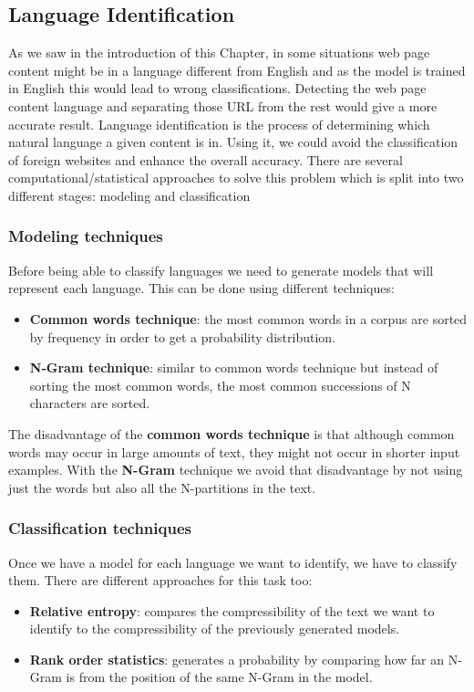 \subsection{Language Identification}
As we saw in the introduction of this Chapter, in some situations web page content might be in a language different from English and as the model is trained in English this would lead to wrong 
classifications. Detecting the web page content language and separating those URL from the rest would give a more accurate result.
Language identification is the process of determining which natural language a given content is in. Using it, we could avoid the classification of foreign websites and enhance the overall accuracy.
There are several computational/statistical approaches to solve this problem which is split into two different stages: modeling and classification

\subsubsection{Modeling techniques}
Before being able to classify languages we need to generate models that will represent each language. This can be done using different techniques:
\begin{itemize}
  \item {\bf Common words technique}: the most common words in a corpus are sorted by frequency in order to get a probability distribution.
  \item {\bf N-Gram technique}: similar to common words technique but instead of sorting the most common words, the most common successions of N characters are sorted.
\end{itemize}  
The disadvantage of the {\bf common words technique} is that although common words may occur in large amounts of text, they might not occur in shorter input examples. With the {\bf N-Gram} technique 
we avoid that disadvantage by not using just the words but also all the N-partitions in the text.


\subsubsection{Classification techniques}
Once we have a model for each language we want to identify, we have to classify them. There are different approaches for this task too:
\begin{itemize}
  \item {\bf Relative entropy}: compares the compressibility of the text we want to identify to the compressibility of the previously generated models.
  \item {\bf Rank order statistics}: generates a probability by comparing how far an N-Gram is from the position of the same N-Gram in the model.
\end{itemize}
